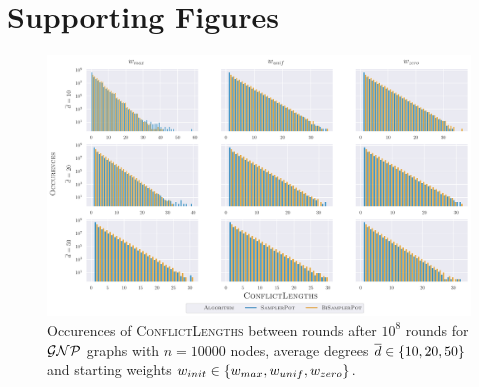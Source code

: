 \chapter{Supporting Figures}\label{sec:supporting_figures}


\begin{figure}
  \centering
  \includegraphics[width=\textwidth]{Figures/experiments/Conflicts_Gnp.pdf}
  \caption{
    Occurences of \textsc{ConflictLengths} between rounds after $10^8$ rounds for $\mathcal{GNP}$ graphs with $n = 10000$ nodes, average degrees $\overline{d} \in \left\{10, 20, 50\right\}$ and starting weights $w_{init} \in \left\{w_{max}, w_{unif}, w_{zero}\right\}$.
  }
  \label{fig:app_conflicts_gnp}
\end{figure}


